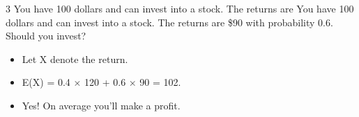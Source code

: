 \documentclass[12pt, letterpaper]{article}
\newcommand{\exheader}[1][ex]{{\tiny{#1}\normalsize}}
\begin{document}
\bigbreak
\bigbreak

\exheader[3] You have 100 dollars and can invest into a stock. The returns are You have 100 dollars and can invest into a stock. The returns are \$90 with probability 0.6. Should you invest?
\begin{itemize}[leftmargin=*,  label={}]
	\item Let X denote the return.
	\item E(X) = 0.4 × 120 + 0.6 × 90 = 102.
	\item Yes! On average you'll make a profit.
\end{itemize}
\end{document}
